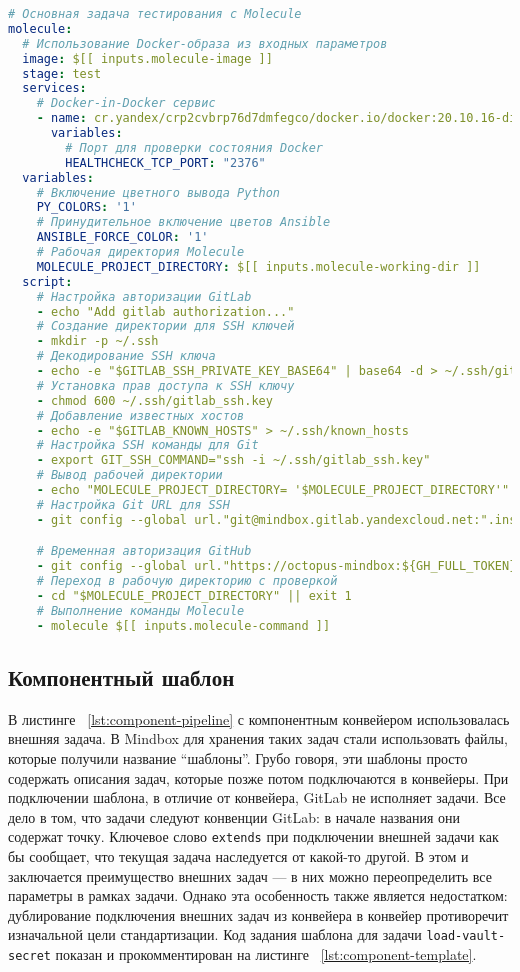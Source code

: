 \begin{lstlisting}[language=yaml,label={lst:component-pipeline},caption={Компонентный конвейер тестирования через Molecule}]
# Основная задача тестирования с Molecule
molecule:
  # Использование Docker-образа из входных параметров
  image: $[[ inputs.molecule-image ]]
  stage: test
  services:
    # Docker-in-Docker сервис
    - name: cr.yandex/crp2cvbrp76d7dmfegco/docker.io/docker:20.10.16-dind
      variables:
        # Порт для проверки состояния Docker
        HEALTHCHECK_TCP_PORT: "2376"
  variables:
    # Включение цветного вывода Python
    PY_COLORS: '1'
    # Принудительное включение цветов Ansible
    ANSIBLE_FORCE_COLOR: '1'
    # Рабочая директория Molecule
    MOLECULE_PROJECT_DIRECTORY: $[[ inputs.molecule-working-dir ]]
  script:
    # Настройка авторизации GitLab
    - echo "Add gitlab authorization..."
    # Создание директории для SSH ключей
    - mkdir -p ~/.ssh
    # Декодирование SSH ключа
    - echo -e "$GITLAB_SSH_PRIVATE_KEY_BASE64" | base64 -d > ~/.ssh/gitlab_ssh.key
    # Установка прав доступа к SSH ключу
    - chmod 600 ~/.ssh/gitlab_ssh.key
    # Добавление известных хостов
    - echo -e "$GITLAB_KNOWN_HOSTS" > ~/.ssh/known_hosts
    # Настройка SSH команды для Git
    - export GIT_SSH_COMMAND="ssh -i ~/.ssh/gitlab_ssh.key"
    # Вывод рабочей директории
    - echo "MOLECULE_PROJECT_DIRECTORY= '$MOLECULE_PROJECT_DIRECTORY'"
    # Настройка Git URL для SSH
    - git config --global url."git@mindbox.gitlab.yandexcloud.net:".insteadOf "https://mindbox.gitlab.yandexcloud.net/"

    # Временная авторизация GitHub
    - git config --global url."https://octopus-mindbox:${GH_FULL_TOKEN}@github.com/mindbox-cloud".insteadOf "https://github.com/mindbox-cloud"
    # Переход в рабочую директорию с проверкой
    - cd "$MOLECULE_PROJECT_DIRECTORY" || exit 1
    # Выполнение команды Molecule
    - molecule $[[ inputs.molecule-command ]]
\end{lstlisting}

\subsection{Компонентный шаблон} \label{subsec:component-template}
В листинге ~\ref{lst:component-pipeline} с компонентным конвейером использовалась внешняя задача.
В Mindbox для хранения таких задач стали использовать файлы, которые получили название \enquote{шаблоны}.
Грубо говоря, эти шаблоны просто содержать описания задач, которые позже потом подключаются в конвейеры.
При подключении шаблона, в отличие от конвейера, GitLab не исполняет задачи.
Все дело в том, что задачи следуют конвенции GitLab: в начале названия они содержат точку.
Ключевое слово \texttt{extends} при подключении внешней задачи как бы сообщает, что текущая задача наследуется от какой-то другой.
В этом и заключается преимущество внешних задач — в них можно переопределить все параметры в рамках задачи.
Однако эта особенность также является недостатком:
дублирование подключения внешних задач из конвейера в конвейер противоречит изначальной цели стандартизации.
Код задания шаблона для задачи \texttt{load-vault-secret} показан и прокомментирован на листинге ~\ref{lst:component-template}.

